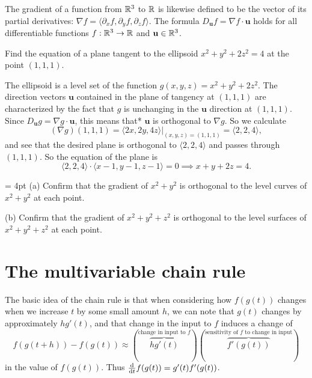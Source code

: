 \documentclass{watsonbook}
\begin{document}
The gradient of a function from $\mathbb{R}^3$ to $\mathbb{R}$ is likewise defined to
be the vector of its partial derivatives:
$\nabla f = \langle \partial_x f, \partial_y f, \partial_z f
\rangle$. The formula $D_{\mathbf{u}} f = \nabla f \cdot \mathbf{u}$
holds for all differentiable functions $f:\mathbb{R}^3 \to \mathbb{R}$ and
$\mathbf{u} \in \mathbb{R}^3$. 

\begin{example}{}{}
  Find the equation of a plane tangent to the ellipsoid $x^2 + y^2 +
  2z^2  = 4$ at the point $(1,1,1)$. 
\end{example}

\begin{solution}
  The ellipsoid is a level set of the function
  $g(x,y,z) = x^2 + y^2 + 2z^2$. The direction vectors $\mathbf{u}$
  contained in the plane of tangency at $(1,1,1)$ are characterized
  by the fact that $g$ is unchanging in the $\mathbf{u}$
  direction at $(1,1,1)$. Since
  $D_{\mathbf{u}}g = \nabla g \cdot \mathbf{u}$, this means that*
  $\mathbf{u}$ is orthogonal to $\nabla g$. So we calculate
  \[
    (\nabla g)(1,1,1) = \left.\langle 2x, 2y, 4z \rangle\right|_{(x,y,z) =
      (1,1,1)} = \langle 2, 2, 4 \rangle, 
  \]
  and see that the desired plane is orthogonal to $\langle 2, 2, 4
  \rangle$ and passes through $(1,1,1)$. So the equation of the
  plane is 
  \[
    \langle 2, 2, 4 \rangle \cdot \langle x - 1, y - 1, z - 1
    \rangle = 0 \implies \boxed{x + y + 2z = 4}. 
  \]
\end{solution}

\begin{exercise}{}{} \parskip = 4pt 
  (a) Confirm that the gradient of $x^2 + y^2$ is orthogonal to the level
  curves of $x^2 + y^2$ at each point.

  (b) Confirm that the gradient of
  $x^2 + y^2 + z^2 $ is orthogonal to the level surfaces of
  $x^2 + y^2 + z^2$ at each point.
\end{exercise}

\section{The multivariable chain rule} \label{sec:chainrule} 


The basic idea of the chain rule is that when considering how
$f(g(t))$ changes when we increase $t$ by some small amount $h$, we
can note that $g(t)$ changes by approximately $hg'(t)$, and that
change in the input to $f$ induces a change of
\[
  f(g(t+h)) - f(g(t)) \approx \left(
    \overbrace{hg'(t)}^{\text{change in input to $f$}} 
  \right) \left( 
    \overbrace{f'(g(t))}^{\text{sensitivity of
        $f$ to change in input}}
  \right) 
\]
in the value of $f(g(t))$. Thus $\tfrac{\mathrm{d}}{\mathrm{d} t} f(g(t)) =
g'(t)f'(g(t))$. 
\end{document}
